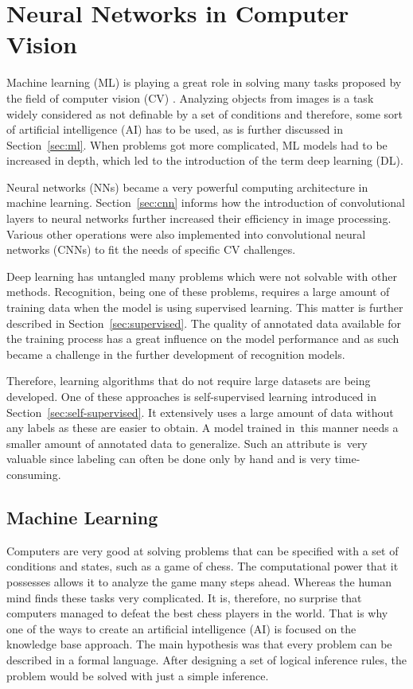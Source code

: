 \chapter{\label{chap:nn-in-cv}Neural Networks in Computer Vision}

Machine learning (ML) is playing a great role in solving many tasks proposed by the field of computer vision (CV) \cite{ComputerVision}. Analyzing objects from images is a task widely considered as not definable by a set of conditions and therefore, some sort of artificial intelligence (AI) has to be used, as is further discussed in Section~\ref{sec:ml}. When problems got more complicated, ML models had to be increased in depth, which led to the introduction of the term deep learning (DL). 

Neural networks (NNs) became a very powerful computing architecture in machine learning. Section~\ref{sec:cnn} informs how the introduction of convolutional layers to neural networks further increased their efficiency in image processing. Various other operations were also implemented into convolutional neural networks (CNNs) to fit the needs of specific CV challenges.

Deep learning has untangled many problems which were not solvable with other methods. Recognition, being one of these problems, requires a large amount of training data when the model is using supervised learning. This matter is further described in Section~\ref{sec:supervised}. The quality of annotated data available for the training process has a great influence on the model performance and as such became a challenge in the further development of recognition models.

Therefore, learning algorithms that do not require large datasets are being developed. One of these approaches is self-supervised learning introduced in Section~\ref{sec:self-supervised}. It extensively uses a large amount of data without any labels as these are easier to obtain. A model trained in~this manner needs a smaller amount of annotated data to generalize. Such an attribute is~very valuable since labeling can often be done only by hand and is very time-consuming.

\section{\label{sec:ml}Machine Learning}

Computers are very good at solving problems that can be specified with a set of conditions and states, such as a game of chess. The computational power that it possesses allows it to analyze the game many steps ahead. Whereas the human mind finds these tasks very complicated. It is, therefore, no surprise that computers managed to defeat the best chess players in the world. That is why one of the ways to create an artificial intelligence (AI) is focused on the knowledge base approach. The main hypothesis was that every problem can be described in a formal language. After designing a set of logical inference rules, the problem would be solved with just a simple inference.

